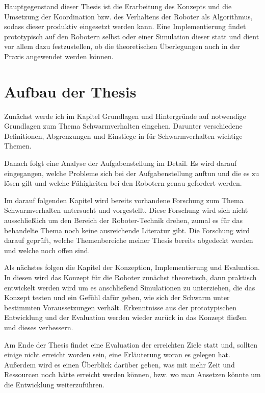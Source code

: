 Hauptgegenstand dieser Thesis ist die Erarbeitung des Konzepts und die Umsetzung der Koordination bzw. des Verhaltens der Roboter als Algorithmus, sodass dieser produktiv eingesetzt werden kann. Eine Implementierung findet prototypisch auf den Robotern selbst oder einer Simulation dieser statt und dient vor allem dazu festzustellen, ob die theoretischen Überlegungen auch in der Praxis angewendet werden können.

\section{Aufbau der Thesis}\label{sec:AufbauDerThesis}
Zunächst werde ich im Kapitel Grundlagen und Hintergründe auf notwendige Grundlagen zum Thema Schwarmverhalten eingehen. Darunter verschiedene Definitionen, Abgrenzungen und Einstiege in für Schwarmverhalten wichtige Themen.

Danach folgt eine Analyse der Aufgabenstellung im Detail. Es wird darauf eingegangen, welche Probleme sich bei der Aufgabenstellung auftun und die es zu lösen gilt und welche Fähigkeiten bei den Robotern genau gefordert werden.

Im darauf folgenden Kapitel wird bereits vorhandene Forschung zum Thema Schwarmverhalten untersucht und vorgestellt. Diese Forschung wird sich nicht ausschließlich um den Bereich der Roboter-Technik drehen, zumal es für das behandelte Thema noch keine ausreichende Literatur gibt. Die Forschung wird darauf geprüft, welche Themenbereiche meiner Thesis bereits abgedeckt werden und welche noch offen sind.

Als nächstes folgen die Kapitel der Konzeption, Implementierung und Evaluation. In diesen wird das Konzept für die Roboter zunächst theoretisch, dann praktisch entwickelt werden wird um es anschließend Simulationen zu unterziehen, die das Konzept testen und ein Gefühl dafür geben, wie sich der Schwarm unter bestimmten Voraussetzungen verhält. Erkenntnisse aus der prototypischen Entwicklung und der Evaluation werden wieder zurück in das Konzept fließen und dieses verbessern.

Am Ende der Thesis findet eine Evaluation der erreichten Ziele statt und, sollten einige nicht erreicht worden sein, eine Erläuterung woran es gelegen hat. Außerdem wird es einen Überblick darüber geben, was mit mehr Zeit und Ressourcen noch hätte erreicht werden können, bzw. wo man Ansetzen könnte um die Entwicklung weiterzuführen.